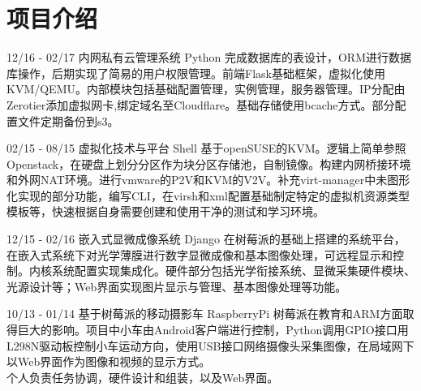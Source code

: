 \documentclass[]{friggeri-cv}
\begin{document}
\section{项目介绍}
\begin{entrylist}
  \entry
    {12/16 - 02/17}
    {内网私有云管理系统}
    {Python}
    { 完成数据库的表设计，ORM进行数据库操作，后期实现了简易的用户权限管理。前端Flask基础框架，虚拟化使用KVM/QEMU。内部模块包括基础配置管理，实例管理，服务器管理。IP分配由Zerotier添加虚拟网卡,绑定域名至Cloudflare。基础存储使用bcache方式。部分配置文件定期备份到s3。
    \\}


  \entry
    {02/15 - 08/15 }
    {虚拟化技术与平台}
    {Shell}
    {基于openSUSE的KVM。逻辑上简单参照Openstack，在硬盘上划分分区作为块分区存储池，自制镜像。构建内网桥接环境和外网NAT环境。进行vmware的P2V和KVM的V2V。补充virt-manager中未图形化实现的部分功能，编写CLI，在virsh和xml配置基础制定特定的虚拟机资源类型模板等，快速根据自身需要创建和使用干净的测试和学习环境。\\}   

  \entry
    {12/15 - 02/16}
    {嵌入式显微成像系统}
    {Django}
    {在树莓派的基础上搭建的系统平台，在嵌入式系统下对光学薄膜进行数字显微成像和基本图像处理，可远程显示和控制。内核系统配置实现集成化。硬件部分包括光学衔接系统、显微采集硬件模块、光源设计等；Web界面实现图片显示与管理、基本图像处理等功能。
   \\ }%

   \entry
   {10/13 - 01/14}
   {基于树莓派的移动摄影车}
   {RaspberryPi}
   {
    树莓派在教育和ARM方面取得巨大的影响。项目中小车由Android客户端进行控制，Python调用GPIO接口用L298N驱动板控制小车运动方向，使用USB接口网络摄像头采集图像，在局域网下以Web界面作为图像和视频的显示方式。\\
    个人负责任务协调，硬件设计和组装，以及Web界面。\\
   }


\end{entrylist}

\newpage

\end{document}
